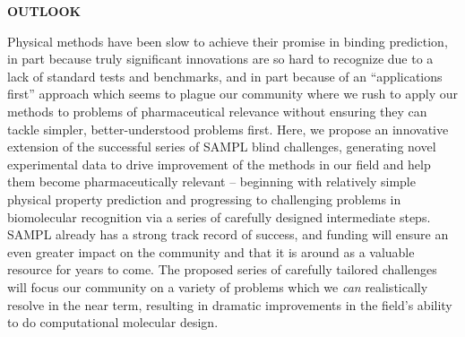\documentclass[11pt]{article}
\begin{document}
{\large \bf OUTLOOK} %

Physical methods have been slow to achieve their promise in binding prediction, in part because truly significant innovations are so hard to recognize due to a lack of standard tests and benchmarks, and in part because of an ``applications first'' approach which seems to plague our community where we rush to apply our methods to problems of pharmaceutical relevance without ensuring they can tackle simpler, better-understood problems first.
Here, we propose an innovative extension of the successful series of SAMPL blind challenges, generating novel experimental data to drive improvement of the methods in our field and help them become pharmaceutically relevant -- beginning with relatively simple physical property prediction and progressing to challenging problems in biomolecular recognition via a series of carefully designed intermediate steps.
SAMPL already has a strong track record of success, and funding will ensure an even greater impact on the community and that it is around as a valuable resource for years to come.
The proposed series of carefully tailored challenges will focus our community on a variety of problems which we \emph{can} realistically resolve in the near term, resulting in dramatic improvements in the field's ability to do computational molecular design.


\eject

%

%

\end{document}
